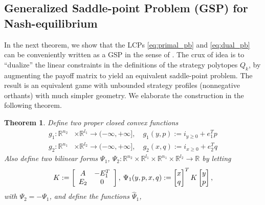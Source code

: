 \documentclass{article}
\newtheorem{theorem}{Theorem}
\begin{document}
\subsection{Generalized Saddle-point Problem (GSP) for
  Nash-equilibrium}
In the next theorem, we show that the LCPs \eqref{eq:primal_pb}
and \eqref{eq:dual_pb} can be
conveniently written as a GSP in the sense of
\cite{he2013accelerating}. The crux of idea is to ``dualize'' the linear
constraints in the definitions of the strategy polytopes $Q_k$, by
augmenting the payoff matrix to yield an equivalent saddle-point
problem. The result is an equivalent game with unbounded strategy
profiles (nonnegative orthants) with much simpler geometry.
We elaborate the construction in the following theorem.
\begin{theorem}
Define two proper closed convex functions
  \begin{eqnarray*}
      g_1: \mathbb{R}^{n_2} &\times \mathbb{R}^{l_1} \rightarrow
      (-\infty, +\infty], \hspace{1em} g_1(y, p) :=
        i_{y \ge 0} + e_1^Tp\\
        g_2: \mathbb{R}^{n_1} &\times \mathbb{R}^{l_2} \rightarrow
        (-\infty, +\infty],\hspace{1em} g_2(x, q) :=
          i_{x \ge 0} + e_2^Tq
    \label{eq:things}
  \end{eqnarray*}
Also define two bilinear forms $\Psi_1$, $\Psi_2: \mathbb{R}^{n_2}
\times \mathbb{R}^{l_1} \times \mathbb{R}^{n_1} \times
\mathbb{R}^{l_2} \rightarrow \mathbb{R}$ by letting
\begin{eqnarray*}
  \begin{split}  
    K :=
    \left[
      \begin{array}{cc}
        A & -E_1^T \\
        E_2 & 0
      \end{array}
      \right],\hspace{.2em}
    \Psi_1(y, p, x, q)
    := \begin{bmatrix}x\\q\end{bmatrix}^T
      K\begin{bmatrix}y\\p\end{bmatrix}, %
\end{split}
\end{eqnarray*}
with $\Psi_2 = -\Psi_1$, and define the functions $\hat{\Psi}_1$,

\end{theorem}
\end{document}
